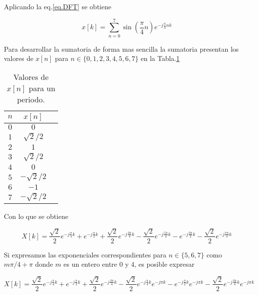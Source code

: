 \documentclass[letterpaper]{article}
\begin{document}
    
Aplicando la eq.\ref{eq.DFT} se obtiene 

\begin{equation}
    x[k] = \sum_{n=0}^{7} \sin \left( \frac{\pi }{4} n \right) e^{-j\frac{\pi }{4}nk} 
\end{equation}

Para desarrollar la sumatoria de forma mas sencilla la sumatoria presentan los valores de $x[n]$ para $n \in \{0, 1, 2, 3, 4 , 5, 6, 7\}$ en la 
Tabla.\ref{tab.xn}

\begin{table}[H]
    \centering
    \begin{tabular}{|c|c|c|}
        \hline $n$ &  $x[n]$\\ 
        \hline $0$ & $0$ \\
        \hline $1$ & $\sqrt{2}/2$ \\
        \hline $2$ & $1$ \\
        \hline $3$ & $\sqrt{2}/2$ \\
        \hline $4$ & $0$ \\
        \hline $5$ & $-\sqrt{2}/2$ \\
        \hline $6$ & $-1$ \\
        \hline $7$ & $-\sqrt{2}/2$ \\
        \hline
    \end{tabular}
    \caption{Valores de $x[n]$ para un periodo.}
    \label{tab.xn}

\end{table}

Con lo que se obtiene 

\begin{equation}
    X[k]= \frac{\sqrt{2}}{2} e^{-j\frac{\pi }{4}k} + e^{-j\frac{\pi }{2}k} + \frac{\sqrt{2}}{2} e^{-j\frac{3\pi }{4}k}
    - \frac{\sqrt{2}}{2} e^{-j\frac{5\pi }{4}k} - e^{-j\frac{3\pi }{2}k} - \frac{\sqrt{2}}{2} e^{-j\frac{7\pi }{4}k} 
\end{equation}

Si expresamos las exponenciales correspondientes para $n \in \{ 5, 6 ,7 \}$ como $m\pi/4 + \pi$ donde $m$ es un entero entre 
$0$ y $4$, es posible expresar 

\begin{equation}
    X[k] = \frac{\sqrt{2}}{2} e^{-j\frac{\pi }{4}k} + e^{-j\frac{\pi }{2}k} + \frac{\sqrt{2}}{2} e^{-j\frac{3\pi }{4}k}
    - \frac{\sqrt{2}}{2} e^{-j\frac{\pi }{4}k} e^{-j\pi k} - e^{-j\frac{\pi }{2}k}e^{-j\pi k} - \frac{\sqrt{2}}{2} e^{-j\frac{3\pi }{4}k} e^{-j\pi k}
\end{equation}
\end{document}
